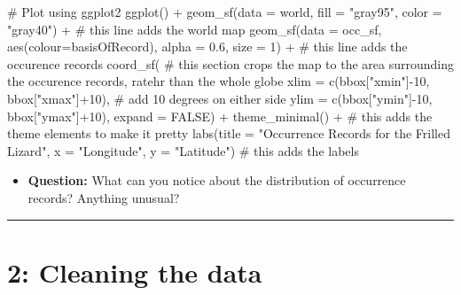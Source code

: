 \documentclass[
  letterpaper,
  DIV=11,
  numbers=noendperiod]{scrartcl}
\newenvironment{Shaded}{\begin{snugshade}}{\end{snugshade}}
\newcommand{\AttributeTok}[1]{\textcolor[rgb]{0.40,0.45,0.13}{#1}}
\newcommand{\CommentTok}[1]{\textcolor[rgb]{0.37,0.37,0.37}{#1}}
\newcommand{\ConstantTok}[1]{\textcolor[rgb]{0.56,0.35,0.01}{#1}}
\newcommand{\DecValTok}[1]{\textcolor[rgb]{0.68,0.00,0.00}{#1}}
\newcommand{\FloatTok}[1]{\textcolor[rgb]{0.68,0.00,0.00}{#1}}
\newcommand{\FunctionTok}[1]{\textcolor[rgb]{0.28,0.35,0.67}{#1}}
\newcommand{\NormalTok}[1]{\textcolor[rgb]{0.00,0.23,0.31}{#1}}
\newcommand{\SpecialCharTok}[1]{\textcolor[rgb]{0.37,0.37,0.37}{#1}}
\newcommand{\StringTok}[1]{\textcolor[rgb]{0.13,0.47,0.30}{#1}}
\providecommand{\tightlist}{%
  \setlength{\itemsep}{0pt}\setlength{\parskip}{0pt}}
\begin{document}
\begin{Shaded}
\begin{Highlighting}[]
\CommentTok{\# Plot using ggplot2}
\FunctionTok{ggplot}\NormalTok{() }\SpecialCharTok{+}
  \FunctionTok{geom\_sf}\NormalTok{(}\AttributeTok{data =}\NormalTok{ world, }\AttributeTok{fill =} \StringTok{"gray95"}\NormalTok{, }\AttributeTok{color =} \StringTok{"gray40"}\NormalTok{) }\SpecialCharTok{+} \CommentTok{\# this line adds the world map}
  \FunctionTok{geom\_sf}\NormalTok{(}\AttributeTok{data =}\NormalTok{ occ\_sf, }\FunctionTok{aes}\NormalTok{(}\AttributeTok{colour=}\NormalTok{basisOfRecord),  }\AttributeTok{alpha =} \FloatTok{0.6}\NormalTok{, }\AttributeTok{size =} \DecValTok{1}\NormalTok{) }\SpecialCharTok{+} \CommentTok{\# this line adds the occurence records}
  \FunctionTok{coord\_sf}\NormalTok{( }\CommentTok{\# this section crops the map to the area surrounding the occurence records, ratehr than the whole globe}
    \AttributeTok{xlim =} \FunctionTok{c}\NormalTok{(bbox[}\StringTok{"xmin"}\NormalTok{]}\SpecialCharTok{{-}}\DecValTok{10}\NormalTok{, bbox[}\StringTok{"xmax"}\NormalTok{]}\SpecialCharTok{+}\DecValTok{10}\NormalTok{), }\CommentTok{\# add 10 degrees on either side }
    \AttributeTok{ylim =} \FunctionTok{c}\NormalTok{(bbox[}\StringTok{"ymin"}\NormalTok{]}\SpecialCharTok{{-}}\DecValTok{10}\NormalTok{, bbox[}\StringTok{"ymax"}\NormalTok{]}\SpecialCharTok{+}\DecValTok{10}\NormalTok{),}
    \AttributeTok{expand =} \ConstantTok{FALSE}\NormalTok{) }\SpecialCharTok{+}
  \FunctionTok{theme\_minimal}\NormalTok{() }\SpecialCharTok{+} \CommentTok{\# this adds the theme elements to make it pretty}
  \FunctionTok{labs}\NormalTok{(}\AttributeTok{title =} \StringTok{"Occurrence Records for the Frilled Lizard"}\NormalTok{, }\AttributeTok{x =} \StringTok{"Longitude"}\NormalTok{, }\AttributeTok{y =} \StringTok{"Latitude"}\NormalTok{) }\CommentTok{\# this adds the labels}
\end{Highlighting}
\end{Shaded}

\begin{itemize}
\tightlist
\item
  \textbf{Question:} What can you notice about the distribution of
  occurrence records? Anything unusual?
\end{itemize}

\begin{center}\rule{0.5\linewidth}{0.5pt}\end{center}

\section{\texorpdfstring{\textbf{2}: Cleaning the
data}{2: Cleaning the data}}\label{cleaning-the-data}
\end{document}
